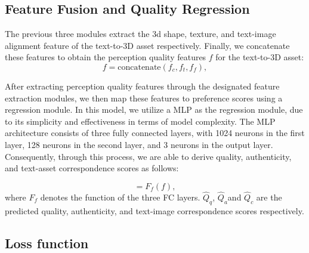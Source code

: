 \subsection{Feature Fusion and Quality Regression}
The previous three modules extract the 3d shape, texture, and text-image alignment feature of the text-to-3D asset respectively. Finally, we concatenate these features to obtain the perception quality features $f$ for the text-to-3D asset:
\begin{equation}
     f  = \text{concatenate}(f_{c},f_{t},f_{f}),
\end{equation}

After extracting perception quality features through the designated feature extraction modules, we then map these features to preference scores using a regression module. In this model, we utilize a MLP as the regression module, due to its simplicity and effectiveness in terms of model complexity. The MLP architecture consists of three fully connected layers, with 1024 neurons in the first layer, 128 neurons in the second layer, and 3 neurons in the output layer. Consequently, through this process, we are able to derive quality, authenticity, and text-asset correspondence scores as follows:

\begin{equation}
     [\hat{Q}_{q},\hat{Q}_{a},\hat{Q}_{c}]  = F_{f}(f),
\end{equation}
where $F_{f}$ denotes the function of the three FC layers. $\hat{Q}_{q}$, $\hat{Q}_{a}$and $\hat{Q}_{c}$ are the predicted quality, authenticity, and text-image correspondence scores respectively.
\vspace{-13pt}
\subsection{Loss function}


